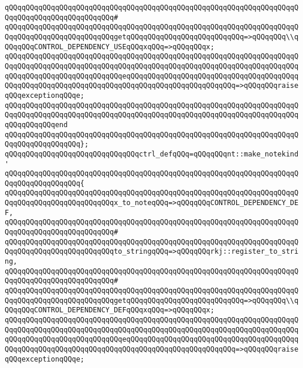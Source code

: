 \verb|qQQqqQQqqQQqqQQqqQQqqQQqqQQqqQQqqQQqqQQqqQQqqQQqqQQqqQQqqQQqqQQqqQQqqQQqqQQqqQQqqQQqqQQqqQQqqQQq#|\newline
\verb|qQQqqQQqqQQqqQQqqQQqqQQqqQQqqQQqqQQqqQQqqQQqqQQqqQQqqQQqqQQqqQQqqQQqqQQqqQQqqQQqqQQqqQQqqQQqqQQqgetqQQqqQQqqQQqqQQqqQQqqQQqqQQq=>qQQqqQQq\\qQQqqQQqCONTROL_DEPENDENCY_USEqQQqxqQQq=>qQQqqQQqx;|\newline
\verb|qQQqqQQqqQQqqQQqqQQqqQQqqQQqqQQqqQQqqQQqqQQqqQQqqQQqqQQqqQQqqQQqqQQqqQQqqQQqqQQqqQQqqQQqqQQqqQQqqQQqqQQqqQQqqQQqqQQqqQQqqQQqqQQqqQQqqQQqqQQqqQQqqQQqqQQqqQQqqQQqqQQqqQQqeqQQqqQQqqQQqqQQqqQQqqQQqqQQqqQQqqQQqqQQqqQQqqQQqqQQqqQQqqQQqqQQqqQQqqQQqqQQqqQQqqQQqqQQqqQQqqQQq=>qQQqqQQqraiseqQQqexceptionqQQqe;|\newline
\verb|qQQqqQQqqQQqqQQqqQQqqQQqqQQqqQQqqQQqqQQqqQQqqQQqqQQqqQQqqQQqqQQqqQQqqQQqqQQqqQQqqQQqqQQqqQQqqQQqqQQqqQQqqQQqqQQqqQQqqQQqqQQqqQQqqQQqqQQqqQQqqQQqqQQqqQQqend|\newline
\verb|qQQqqQQqqQQqqQQqqQQqqQQqqQQqqQQqqQQqqQQqqQQqqQQqqQQqqQQqqQQqqQQqqQQqqQQqqQQqqQQqqQQqqQQq};|\newline
\newline
\verb|qQQqqQQqqQQqqQQqqQQqqQQqqQQqqQQqctrl_defqQQq=qQQqqQQqnt::make_notekind'|\newline
\verb|qQQqqQQqqQQqqQQqqQQqqQQqqQQqqQQqqQQqqQQqqQQqqQQqqQQqqQQqqQQqqQQqqQQqqQQqqQQqqQQqqQQqqQQq{|\newline
\verb|qQQqqQQqqQQqqQQqqQQqqQQqqQQqqQQqqQQqqQQqqQQqqQQqqQQqqQQqqQQqqQQqqQQqqQQqqQQqqQQqqQQqqQQqqQQqqQQqx_to_noteqQQq=>qQQqqQQqCONTROL_DEPENDENCY_DEF,|\newline
\verb|qQQqqQQqqQQqqQQqqQQqqQQqqQQqqQQqqQQqqQQqqQQqqQQqqQQqqQQqqQQqqQQqqQQqqQQqqQQqqQQqqQQqqQQqqQQqqQQq#|\newline
\verb|qQQqqQQqqQQqqQQqqQQqqQQqqQQqqQQqqQQqqQQqqQQqqQQqqQQqqQQqqQQqqQQqqQQqqQQqqQQqqQQqqQQqqQQqqQQqqQQqto_stringqQQq=>qQQqqQQqrkj::register_to_string,|\newline
\verb|qQQqqQQqqQQqqQQqqQQqqQQqqQQqqQQqqQQqqQQqqQQqqQQqqQQqqQQqqQQqqQQqqQQqqQQqqQQqqQQqqQQqqQQqqQQqqQQq#|\newline
\verb|qQQqqQQqqQQqqQQqqQQqqQQqqQQqqQQqqQQqqQQqqQQqqQQqqQQqqQQqqQQqqQQqqQQqqQQqqQQqqQQqqQQqqQQqqQQqqQQqgetqQQqqQQqqQQqqQQqqQQqqQQqqQQq=>qQQqqQQq\\qQQqqQQqCONTROL_DEPENDENCY_DEFqQQqxqQQq=>qQQqqQQqx;|\newline
\verb|qQQqqQQqqQQqqQQqqQQqqQQqqQQqqQQqqQQqqQQqqQQqqQQqqQQqqQQqqQQqqQQqqQQqqQQqqQQqqQQqqQQqqQQqqQQqqQQqqQQqqQQqqQQqqQQqqQQqqQQqqQQqqQQqqQQqqQQqqQQqqQQqqQQqqQQqqQQqqQQqqQQqqQQqeqQQqqQQqqQQqqQQqqQQqqQQqqQQqqQQqqQQqqQQqqQQqqQQqqQQqqQQqqQQqqQQqqQQqqQQqqQQqqQQqqQQqqQQqqQQqqQQq=>qQQqqQQqraiseqQQqexceptionqQQqe;|\newline
